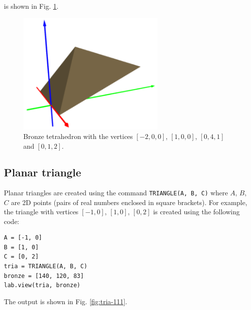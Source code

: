 \noindent
is shown in Fig. \ref{fig:chull}.

\begin{figure}[!ht]
\begin{center}
\includegraphics[width=0.65\textwidth]{img/chull1.png}
\end{center}
\vspace{-2mm}
\caption{Bronze tetrahedron with the vertices $[-2, 0, 0]$, $[1, 0, 0]$, $[0, 4, 1]$ and $[0, 1, 2]$.}
\label{fig:chull}
\end{figure}
\noindent

\subsection{Planar triangle}

Planar triangles are created using the command {\tt TRIANGLE(A, B, C)} where 
$A$, $B$, $C$ are 2D points (pairs of real numbers enclosed in square brackets).
For example, the triangle with vertices $[-1, 0]$, $[1, 0]$, $[0, 2]$ is 
created using the following code:\\

\begin{bbox}
\begin{verbatim}
A = [-1, 0] 
B = [1, 0] 
C = [0, 2] 
tria = TRIANGLE(A, B, C)
bronze = [140, 120, 83]
lab.view(tria, bronze)
\end{verbatim}
\end{bbox}
\vspace{6mm}

\noindent
The output is shown in Fig. \ref{fig:tria-111}.

